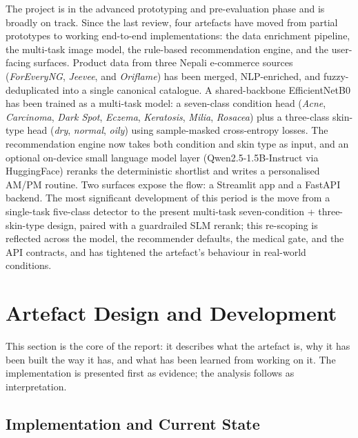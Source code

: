 \documentclass[11pt,a4paper]{article}
\let\oldsection\section
\renewcommand{\section}{\clearpage\oldsection}
\begin{document}
The project is in the advanced prototyping and pre-evaluation phase and
is broadly on track. Since the last review, four artefacts have moved
from partial prototypes to working end-to-end implementations: the data
enrichment pipeline, the multi-task image model, the rule-based
recommendation engine, and the user-facing surfaces. Product data from
three Nepali e-commerce sources (\emph{ForEveryNG}, \emph{Jeevee}, and
\emph{Oriflame}) has been merged, NLP-enriched, and fuzzy-deduplicated
into a single canonical catalogue. A shared-backbone EfficientNetB0 has
been trained as a multi-task model: a seven-class condition head
(\emph{Acne}, \emph{Carcinoma}, \emph{Dark Spot}, \emph{Eczema},
\emph{Keratosis}, \emph{Milia}, \emph{Rosacea}) plus a three-class
skin-type head (\emph{dry}, \emph{normal}, \emph{oily}) using
sample-masked cross-entropy losses. The recommendation engine now takes
both condition and skin type as input, and an optional on-device small
language model layer (Qwen2.5-1.5B-Instruct via HuggingFace) reranks
the deterministic shortlist and writes a personalised AM/PM routine.
Two surfaces expose the flow: a Streamlit app and a FastAPI backend.
The most significant development of this period is the move from a
single-task five-class detector to the present multi-task
seven-condition + three-skin-type design, paired with a guardrailed
SLM rerank; this re-scoping is reflected across the model, the
recommender defaults, the medical gate, and the API contracts, and has
tightened the artefact's behaviour in real-world conditions.

\section{Artefact Design and Development}

This section is the core of the report: it describes what the artefact
is, why it has been built the way it has, and what has been learned
from working on it. The implementation is presented first as evidence;
the analysis follows as interpretation.

\subsection{Implementation and Current State}
\end{document}
